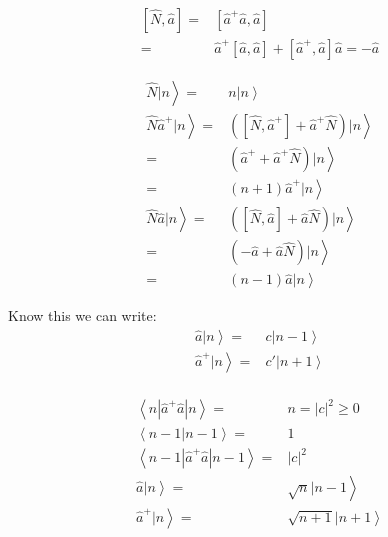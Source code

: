 		\begin{align}
			\left[\hat{N}, \hat{a}\right] =& \left[\hat{a}^+\hat{a}, \hat{a}\right]\\
			 =& \hat{a}^+\left[\hat{a}, \hat{a}\right]+\left[\hat{a}^+, \hat{a}\right]\hat{a} = -\hat{a}
		\end{align}
		
		\begin{align}
			\left. \hat{N} | n \right\rangle =& \left. n | n \right\rangle \\
			\left. \hat{N}\hat{a}^+ | n \right\rangle =& \left. \left(\left[\hat{N}, \hat{a}^+\right] + \hat{a}^+\hat{N}\right)|n\right\rangle\\ 
			=& \left. \left(\hat{a}^+ + \hat{a}^+\hat{N}\right)|n\right\rangle\\ 
			=& \left.\left(n+1\right)\hat{a}^+|n\right\rangle \\
			\left. \hat{N}\hat{a} | n \right\rangle =& \left. \left(\left[\hat{N}, \hat{a}\right] + \hat{a}\hat{N}\right)|n\right\rangle\\ 
			=& \left. \left(-\hat{a} + \hat{a}\hat{N}\right)|n\right\rangle\\ 
			=& \left.\left(n-1\right)\hat{a}|n\right\rangle		
		\end{align}
	
		Know this we can write:
		\begin{align}
			\left. \hat{a}|n\right\rangle =& \left. c | n-1 \right\rangle \\
			\left. \hat{a}^+|n\right\rangle =& \left. c' | n+1 \right\rangle \\		
		\end{align}
	
		\begin{align}
			\left\langle n | \hat{a}^+\hat{a} | n \right\rangle =& n = |c|^2 \geq 0 \\
			\left\langle n - 1 | n - 1 \right\rangle =& 1 \\
			\left\langle n - 1 | \hat{a}^+\hat{a} | n - 1 \right\rangle =& |c|^2 \\	
			\left. \hat{a} | n \right\rangle =& \left.\sqrt{n}|n-1\right\rangle \\
			\left. \hat{a}^+| n \right\rangle =& \left.\sqrt{n+1}|n+1\right\rangle \\		
		\end{align}
	
